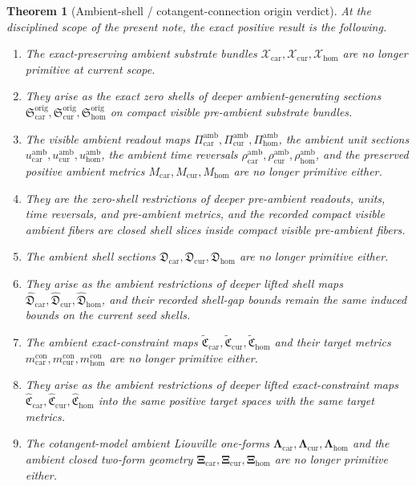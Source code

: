 \documentclass[11pt]{article}
\newcommand{\TensorConstraintMetric}{m_{\mathrm{car}}^{\mathrm{con}}}
\newcommand{\CurConstraintMetric}{m_{\mathrm{cur}}^{\mathrm{con}}}
\newcommand{\HomConstraintMetric}{m_{\mathrm{hom}}^{\mathrm{con}}}
\newcommand{\TensorAmbientSpace}{\mathcal X_{\mathrm{car}}}
\newcommand{\CurAmbientSpace}{\mathcal X_{\mathrm{cur}}}
\newcommand{\HomAmbientSpace}{\mathcal X_{\mathrm{hom}}}
\newcommand{\TensorAmbientRead}{\Pi_{\mathrm{car}}^{\mathrm{amb}}}
\newcommand{\CurAmbientRead}{\Pi_{\mathrm{cur}}^{\mathrm{amb}}}
\newcommand{\HomAmbientRead}{\Pi_{\mathrm{hom}}^{\mathrm{amb}}}
\newcommand{\TensorAmbientUnit}{u_{\mathrm{car}}^{\mathrm{amb}}}
\newcommand{\CurAmbientUnit}{u_{\mathrm{cur}}^{\mathrm{amb}}}
\newcommand{\HomAmbientUnit}{u_{\mathrm{hom}}^{\mathrm{amb}}}
\newcommand{\TensorAmbientTimeRev}{\rho_{\mathrm{car}}^{\mathrm{amb}}}
\newcommand{\CurAmbientTimeRev}{\rho_{\mathrm{cur}}^{\mathrm{amb}}}
\newcommand{\HomAmbientTimeRev}{\rho_{\mathrm{hom}}^{\mathrm{amb}}}
\newcommand{\TensorAmbientMetric}{M_{\mathrm{car}}}
\newcommand{\CurAmbientMetric}{M_{\mathrm{cur}}}
\newcommand{\HomAmbientMetric}{M_{\mathrm{hom}}}
\newcommand{\TensorShellSection}{\mathfrak D_{\mathrm{car}}}
\newcommand{\CurShellSection}{\mathfrak D_{\mathrm{cur}}}
\newcommand{\HomShellSection}{\mathfrak D_{\mathrm{hom}}}
\newcommand{\TensorAmbientConstraintMap}{\widetilde{\mathfrak C}_{\mathrm{car}}}
\newcommand{\CurAmbientConstraintMap}{\widetilde{\mathfrak C}_{\mathrm{cur}}}
\newcommand{\HomAmbientConstraintMap}{\widetilde{\mathfrak C}_{\mathrm{hom}}}
\newcommand{\TensorAmbientLiouville}{\boldsymbol{\Lambda}_{\mathrm{car}}}
\newcommand{\CurAmbientLiouville}{\boldsymbol{\Lambda}_{\mathrm{cur}}}
\newcommand{\HomAmbientLiouville}{\boldsymbol{\Lambda}_{\mathrm{hom}}}
\newcommand{\TensorAmbientTwo}{\boldsymbol{\Xi}_{\mathrm{car}}}
\newcommand{\CurAmbientTwo}{\boldsymbol{\Xi}_{\mathrm{cur}}}
\newcommand{\HomAmbientTwo}{\boldsymbol{\Xi}_{\mathrm{hom}}}
\newcommand{\TensorOriginSection}{\mathfrak S_{\mathrm{car}}^{\mathrm{orig}}}
\newcommand{\CurOriginSection}{\mathfrak S_{\mathrm{cur}}^{\mathrm{orig}}}
\newcommand{\HomOriginSection}{\mathfrak S_{\mathrm{hom}}^{\mathrm{orig}}}
\newcommand{\TensorLiftedShellSection}{\widehat{\mathfrak D}_{\mathrm{car}}}
\newcommand{\CurLiftedShellSection}{\widehat{\mathfrak D}_{\mathrm{cur}}}
\newcommand{\HomLiftedShellSection}{\widehat{\mathfrak D}_{\mathrm{hom}}}
\newcommand{\TensorOriginConstraintMap}{\widehat{\mathfrak C}_{\mathrm{car}}}
\newcommand{\CurOriginConstraintMap}{\widehat{\mathfrak C}_{\mathrm{cur}}}
\newcommand{\HomOriginConstraintMap}{\widehat{\mathfrak C}_{\mathrm{hom}}}
\newtheorem{theorem}{Theorem}
\begin{document}
\begin{theorem}[Ambient-shell / cotangent-connection origin verdict]
\label{thm:verdict}
At the disciplined scope of the present note, the exact positive result is the following.
\begin{enumerate}
    \item The exact-preserving ambient substrate bundles \(\TensorAmbientSpace,\CurAmbientSpace,\HomAmbientSpace\) are no longer primitive at current scope.
    \item They arise as the exact zero shells of deeper ambient-generating sections \(\TensorOriginSection,\CurOriginSection,\HomOriginSection\) on compact visible pre-ambient substrate bundles.
    \item The visible ambient readout maps \(\TensorAmbientRead,\CurAmbientRead,\HomAmbientRead\), the ambient unit sections \(\TensorAmbientUnit,\CurAmbientUnit,\HomAmbientUnit\), the ambient time reversals \(\TensorAmbientTimeRev,\CurAmbientTimeRev,\HomAmbientTimeRev\), and the preserved positive ambient metrics \(\TensorAmbientMetric,\CurAmbientMetric,\HomAmbientMetric\) are no longer primitive either.
    \item They are the zero-shell restrictions of deeper pre-ambient readouts, units, time reversals, and pre-ambient metrics, and the recorded compact visible ambient fibers are closed shell slices inside compact visible pre-ambient fibers.
    \item The ambient shell sections \(\TensorShellSection,\CurShellSection,\HomShellSection\) are no longer primitive either.
    \item They arise as the ambient restrictions of deeper lifted shell maps \(\TensorLiftedShellSection,\CurLiftedShellSection,\HomLiftedShellSection\), and their recorded shell-gap bounds remain the same induced bounds on the current seed shells.
    \item The ambient exact-constraint maps \(\TensorAmbientConstraintMap,\CurAmbientConstraintMap,\HomAmbientConstraintMap\) and their target metrics \(\TensorConstraintMetric,\CurConstraintMetric,\HomConstraintMetric\) are no longer primitive either.
    \item They arise as the ambient restrictions of deeper lifted exact-constraint maps \(\TensorOriginConstraintMap,\CurOriginConstraintMap,\HomOriginConstraintMap\) into the same positive target spaces with the same target metrics.
    \item The cotangent-model ambient Liouville one-forms \(\TensorAmbientLiouville,\CurAmbientLiouville,\HomAmbientLiouville\) and the ambient closed two-form geometry \(\TensorAmbientTwo,\CurAmbientTwo,\HomAmbientTwo\) are no longer primitive either.

\end{enumerate}
\end{theorem}
\end{document}
